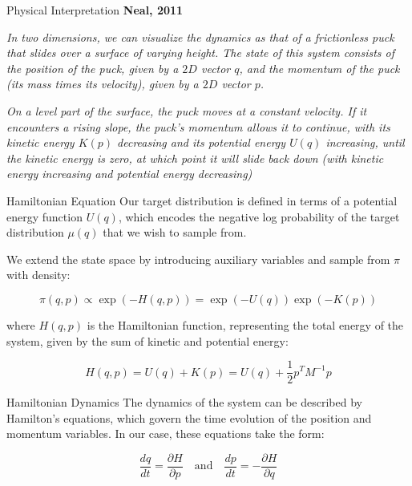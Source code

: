 \begin{frame}{Physical Interpretation}
	\textbf{Neal, 2011}

	\textit{
		In two dimensions, we can visualize the dynamics as that of a frictionless puck that
		slides over a surface of varying height. The state of this system consists of the
		position of the puck, given by a $2D$ vector $q$, and the momentum of the puck
		(its mass times its velocity), given by a $2D$ vector $p$.}

	\vspace{0.5cm}
	\textit{
		On a level part of the surface, the puck moves at a constant velocity.
		If it encounters a rising slope, the puck's momentum allows it to continue, with its
		kinetic energy $K(p)$ decreasing and its potential energy $U(q)$ increasing, until the kinetic energy
		is zero, at which point it will slide back down (with kinetic energy increasing and
		potential energy decreasing)}

\end{frame}

\begin{frame}{Hamiltonian Equation}
	Our target distribution is defined in terms of a potential energy function $U(q)$,
	which encodes the negative log probability of the target distribution $\mu(q)$ that we wish to sample from.

	We extend the state space by introducing auxiliary variables and sample from $\pi$ with density:
	
	\begin{equation*}
		\pi(q, p) \propto \exp(-H(q, p)) = \exp(-U(q)) \exp(-K(p))	
	\end{equation*}

	where $H(q, p)$ is the Hamiltonian function, representing the total energy of the system,
	given by the sum of kinetic and potential energy:

	\begin{equation*}
		H(q, p) = U(q) + K(p) = U(q) + \frac{1}{2} p^T M^{-1} p
	\end{equation*}
\end{frame}


\begin{frame}{Hamiltonian Dynamics}
	The dynamics of the system can be described by Hamilton's equations, which govern
	the time evolution of the position and momentum variables. In our case, these equations
	take the form:

	\begin{equation*}
		\frac{dq}{dt} = \frac{\partial H}{\partial p} \quad \text{and} \quad
		\frac{dp}{dt} = -\frac{\partial H}{\partial q}
	\end{equation*}
\end{frame}

